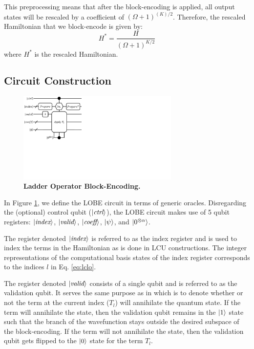 This preprocessing means that after the block-encoding is applied, all output states will be rescaled by a coefficient of $(\Omega + 1)^{(K)/2}$.
Therefore, the rescaled Hamiltonian that we block-encode is given by:
\begin{equation}
    \label{bose coeff rescale}
    H^* = \frac{H}{(\Omega + 1)^{K/2}}
\end{equation}
where $H^*$ is the rescaled Hamiltonian.

\subsection{Circuit Construction}
\label{subsec:circuit}

\begin{figure}
    \centering
    \includegraphics[width=8cm]{figures/lobe-block-encoding.pdf}
    \caption{\textbf{Ladder Operator Block-Encoding.}
    }
    \label{fig:lobe}
\end{figure}

In Figure \ref{fig:lobe}, we define the LOBE circuit in terms of generic oracles.
Disregarding the (optional) control qubit ($\ket{\textit{ctrl}}$), the LOBE circuit makes use of 5 qubit registers: $\ket{\textit{index}}$, $\ket{\textit{valid}}$, $\ket{\textit{coeff}}$, $\ket{\psi}$, and $\ket{0^{\otimes \alpha}}$.

The register denoted $\ket{\textit{index}}$ is referred to as the index register and is used to index the terms in the Hamiltonian as is done in LCU constructions. 
The integer representations of the computational basis states of the index register corresponds to the indices $l$ in Eq. \ref{eq:lclo}. 

The register denoted $\ket{\textit{valid}}$ consists of a single qubit and is referred to as the validation qubit.
It serves the same purpose as in \cite{liu2024efficient} which is to denote whether or not the term at the current index ($T_l$) will annihilate the quantum state.
If the term will annihilate the state, then the validation qubit remains in the $\ket{1}$ state such that the branch of the wavefunction stays outside the desired subspace of the block-encoding.
If the term will not annihilate the state, then the validation qubit gets flipped to the $\ket{0}$ state for the term $T_l$.

